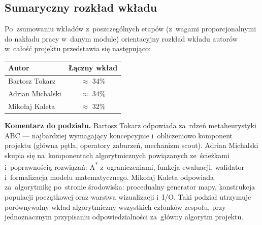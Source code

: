 \subsection*{Sumaryczny rozkład wkładu}

Po~zsumowaniu wkładów z~poszczególnych etapów (z~wagami proporcjonalnymi
do nakładu pracy w~danym module) orientacyjny rozkład wkładu autorów
w~całość projektu przedstawia się następująco:

\begin{center}
\begin{tabular}{l c}
\toprule
\textbf{Autor} & \textbf{Łączny wkład} \\
\midrule
Bartosz Tokarz   & $\approx$ 34\% \\
Adrian Michalski & $\approx$ 34\% \\
Mikołaj Kaleta   & $\approx$ 32\% \\
\bottomrule
\end{tabular}
\end{center}

\noindent
\textbf{Komentarz do podziału.}
Bartosz Tokarz odpowiada za~rdzeń metaheurystyki ABC --- najbardziej
wymagający koncepcyjnie i~obliczeniowo komponent projektu (główna
pętla, operatory zaburzeń, mechanizm scout). Adrian Michalski skupia
się na~komponentach algorytmicznych powiązanych ze~ścieżkami
i~poprawnością rozwiązań: A\textsuperscript{*} z~ograniczeniami,
funkcja ewaluacji, walidator i~formalizacja modelu matematycznego.
Mikołaj Kaleta odpowiada za~algorytmikę po~stronie środowiska:
procedualny generator mapy, konstrukcja populacji początkowej oraz
warstwa wizualizacji i~I/O. Taki podział utrzymuje porównywalny wkład
algorytmiczny wszystkich członków zespołu, przy jednoznacznym
przypisaniu odpowiedzialności za~główny algorytm projektu.
